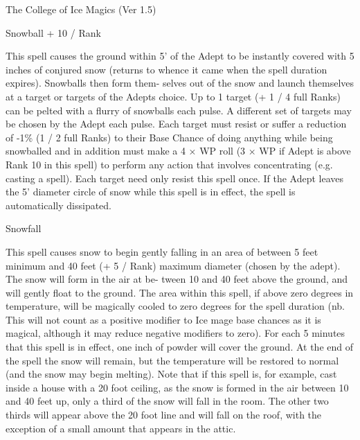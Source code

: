 \begin{Chapter}{The College of Ice Magics (Ver 1.5)}
\begin{spell}[S-13]{Snowball }
+ 10 / Rank 
\begin{effects}
 This  spell  causes  the  ground  within  5’  of 
the Adept to be instantly covered  with 5 inches of 
conjured snow (returns to whence it came when the 
spell duration expires). Snowballs then form them-
selves  out  of  the  snow  and  launch themselves  at  a 
target  or  targets  of  the  Adepts  choice.  Up  to  1 
target  (+  1  /  4  full  Ranks)  can  be  pelted  with  a 
flurry  of  snowballs  each  pulse.  A  different  set  of 
targets  may  be  chosen  by  the  Adept  each  pulse. 
Each target must resist or suffer a reduction of -1\% 
(1  /  2  full  Ranks)  to  their  Base  Chance  of  doing 
anything  while  being  snowballed  and  in  addition 
must  make  a  4  ×  WP  roll  (3  ×  WP  if  Adept  is 
above Rank 10 in this spell) to perform any action 
that  involves  concentrating  (e.g.  casting  a  spell). 
Each  target  need  only  resist  this  spell  once.  If  the 
Adept  leaves  the  5’  diameter  circle  of  snow  while 
this  spell  is  in  effect,  the  spell  is  automatically 
dissipated. 

\end{effects}
\end{spell}

\begin{spell}[S-14]{Snowfall }

\begin{effects}
 This  spell  causes  snow  to  begin  gently 
falling  in  an  area  of  between  5  feet  minimum and 
40 feet (+ 5 / Rank) maximum diameter (chosen by 
the  adept).  The  snow  will  form  in  the  air  at  be-
tween  10  and  40  feet  above  the  ground,  and  will 
gently  float  to  the  ground.  The  area  within  this 
spell, if above zero degrees in temperature, will be 
magically  cooled  to  zero  degrees  for  the  spell 
duration  (nb.  This  will  not  count  as  a  positive 
modifier to Ice mage base chances as it is magical, 
although it may reduce negative modifiers to zero). 
For  each  5  minutes  that  this  spell  is  in  effect,  one 
inch of powder will cover the ground. At the end of 
the spell the snow will remain, but the temperature 
will be restored to normal (and the snow may begin 
melting). Note that if this spell is, for example, cast 
inside a house with a 20 foot ceiling, as the snow is 
formed in the air between 10 and 40 feet up, only a 
third  of  the  snow  will  fall  in  the  room.  The  other 
two  thirds  will  appear  above  the  20  foot  line  and 
will fall on the roof,  with the exception of a small 
amount that appears in the attic. 


\end{effects}
\end{spell}
\end{Chapter}
